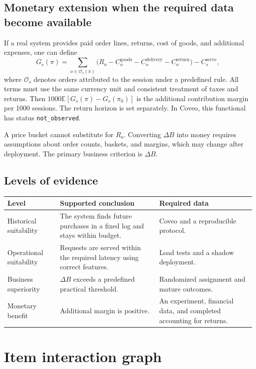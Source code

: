 \documentclass[12pt,a4paper]{article}
\newcommand{\code}[1]{{\ttfamily\small\nolinkurl{#1}}}
\newcommand{\E}{\mathbb E}
\theoremstyle{plainru}
\begin{document}
\subsection{Monetary extension when the required data become available}

If a real system provides paid order lines, returns,
cost of goods, and additional expenses, one can define
\begin{equation}\label{eq:business-margin}
G_s(\pi)=\sum_{o\in\mathcal O_s(\pi)}
\bigl(R_o-C_o^{\mathrm{goods}}-C_o^{\mathrm{delivery}}
-C_o^{\mathrm{return}}\bigr)-C_s^{\mathrm{serve}},
\end{equation}
where \(\mathcal O_s\) denotes orders attributed to the session under a predefined
rule. All terms must use the same currency unit
and consistent treatment of taxes and returns.
Then \(1000\E[G_s(\pi)-G_s(\pi_0)]\) is the additional
contribution margin per 1000 sessions. The return horizon is set separately.
In Coveo, this functional has status \code{not_observed}.

A price bucket cannot substitute for \(R_o\). Converting \(\Delta B\) into money
requires assumptions about order counts, baskets, and margins, which may
change after deployment. The primary business criterion is \(\Delta B\).

\subsection{Levels of evidence}

\begin{longtable}{L{0.26\textwidth}L{0.32\textwidth}L{0.32\textwidth}}
\toprule Level & Supported conclusion & Required data \\\midrule\endhead
Historical suitability & The system finds future purchases in a fixed
log and stays within budget. & Coveo and a reproducible protocol. \\
Operational suitability & Requests are served within the required latency
using correct features. & Load tests and a shadow deployment. \\
Business superiority & \(\Delta B\) exceeds a predefined practical threshold. &
Randomized assignment and mature outcomes. \\
Monetary benefit & Additional margin is positive. & An experiment,
financial data, and completed accounting for returns. \\
\bottomrule
\end{longtable}

\section{Item interaction graph}\label{sec:model-graph}
\end{document}

